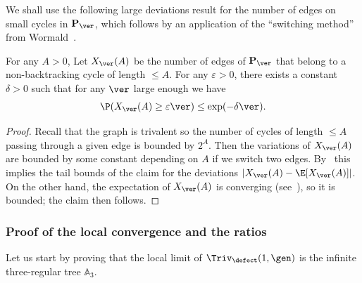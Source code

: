 We shall use the following large deviations result for the number of edges on small cycles in $\mathbf{P}_{\ver}$, which follows by an application of the ``switching method'' from Wormald~\cite[Th.\,2.19]{Wor99}.

\begin{lemma}
\label{lem:grandes_dev_cycles_config}
For any $A>0$, Let $X_{ \ver}(A)$ be the number of edges of $\mathbf{P}_{\ver}$ that belong to a non-backtracking cycle of length $\leq A$. For any $ \varepsilon>0$, there exists a constant $ \delta >0$ such that for any $\ver$ large enough we have
\[
\P(X_{ \ver}(A) \geq \varepsilon \ver) \leq \mathrm{exp}(- \delta \ver).
\]
\end{lemma}

\begin{proof}
Recall that the graph is trivalent so the number of cycles of length $\leq A$ passing through a given edge is bounded by $2^A$. Then the variations of $ X_{ \ver}(A)$ are bounded by some constant depending on $A$ if we switch two edges. By~\cite[Th.\,2.19]{Wor99} this implies the tail bounds of the claim for the deviations $|X_{ \ver}(A) - \E[X_{ \ver}(A)]|$. On the other hand, the expectation of $X_{ \ver}(A)$ is converging (see~\cite[Eq.\,(8) in \S2.3]{Wor99}), so it is bounded; the claim then follows.
\end{proof}

\subsubsection{Proof of the local convergence and the ratios}

Let us start by proving that the local limit of $ \Triv_{\defect}(1, \gen)$ is the infinite three-regular tree $\mathbb{A}_3$.

